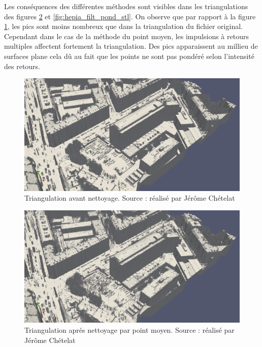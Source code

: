 \newpage


Les conséquences des différentes méthodes sont visibles dans les triangulations des figures
\ref{fig:hepia_filt_avg_stl} et \ref{fig:hepia_filt_pond_stl}. On observe que par
rapport à la figure \ref{fig:hepia_no_filt_stl}, les pics sont moins nombreux 
que dans la triangulation du fichier original. Cependant dans le cas
de la méthode du point moyen, les impulsions à retours multiples affectent
fortement la triangulation. Des pics apparaissent au millieu de surfaces plane
cela dû au fait que les points ne sont pas pondéré selon l'intensité des
retours.

\begin{figure}[htbp!]
    \centering
	\includegraphics[width=0.9\linewidth]{figures/filters/hepia_stl.png}
	\caption{Triangulation avant nettoyage. Source : réalisé par Jérôme Chételat}
	\label{fig:hepia_no_filt_stl}
\end{figure}

\begin{figure}[htbp!]
    \centering
	\includegraphics[width=0.9\linewidth]{figures/filters/hepia_filtered_avg_stl.png}
	\caption{Triangulation aprés nettoyage par point moyen. Source : réalisé par Jérôme Chételat}
	\label{fig:hepia_filt_avg_stl}
\end{figure}

